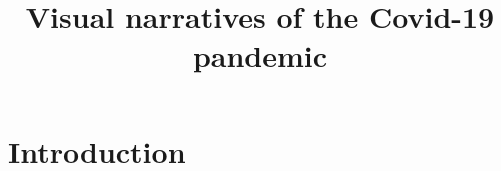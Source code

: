 \documentclass[article]{jdssv}\usepackage[]{graphicx}\usepackage[]{xcolor} %
\author{
   \And }
\title{Visual narratives of the Covid-19 pandemic}
\begin{document}







\section{Introduction}
\end{document}
